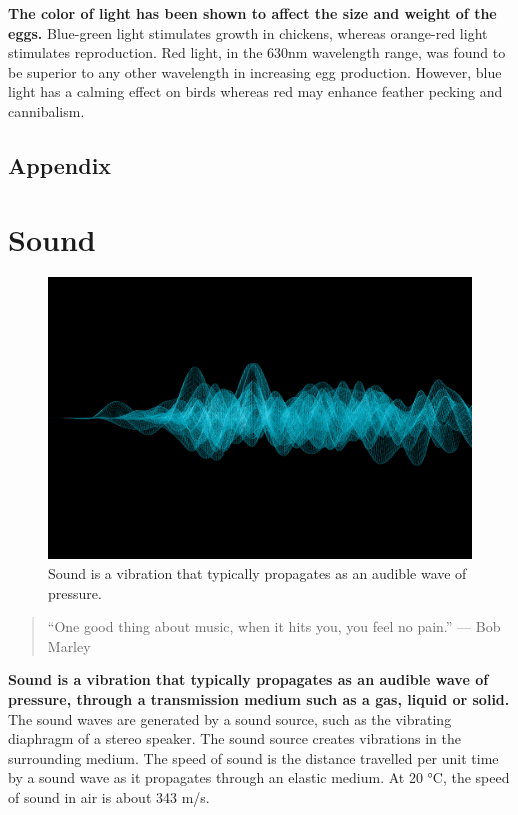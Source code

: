 \documentclass[]{book}
\begin{document}
\textbf{The color of light has been shown to affect the size and weight of the eggs.} Blue-green light stimulates growth in chickens, whereas orange-red light stimulates reproduction. Red light, in the 630nm wavelength range, was found to be superior to any other wavelength in increasing egg production. However, blue light has a calming effect on birds whereas red may enhance feather pecking and cannibalism.

\hypertarget{appendix}{%
\section{Appendix}\label{appendix}}

\hypertarget{sound}{%
\chapter{Sound}\label{sound}}

\begin{figure}

{\centering \includegraphics[width=1\linewidth,height=0.5\textheight]{figures/soundwave} 

}

\caption{Sound is a vibration that typically propagates as an audible wave of pressure.}\label{fig:soundwave}
\end{figure}

\begin{quote}
``One good thing about music, when it hits you, you feel no pain.'' --- Bob Marley
\end{quote}

\textbf{Sound is a vibration that typically propagates as an audible wave of pressure, through a transmission medium such as a gas, liquid or solid.} The sound waves are generated by a sound source, such as the vibrating diaphragm of a stereo speaker. The sound source creates vibrations in the surrounding medium. The speed of sound is the distance travelled per unit time by a sound wave as it propagates through an elastic medium. At 20 °C, the speed of sound in air is about 343 m/s.
\end{document}
